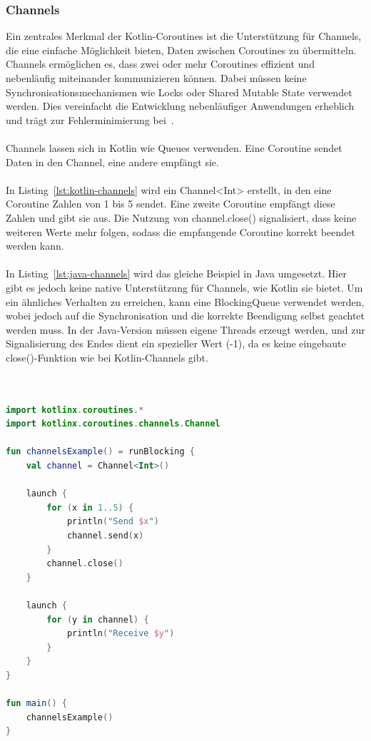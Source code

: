 \documentclass[11pt]{article}
\begin{document}
    \subsubsection{Channels}
    Ein zentrales Merkmal der Kotlin-Coroutines ist die Unterstützung für Channels, die eine einfache Möglichkeit bieten, Daten zwischen Coroutines zu übermitteln.
    Channels ermöglichen es, dass zwei oder mehr Coroutines effizient und nebenläufig miteinander kommunizieren können.
    Dabei müssen keine Synchronisationsmechanismen wie Locks oder Shared Mutable State verwendet werden.
    Dies vereinfacht die Entwicklung nebenläufiger Anwendungen erheblich und trägt zur Fehlerminimierung bei~\cite[208]{kotlin-patterns}.\\
    \\
    Channels lassen sich in Kotlin wie Queues verwenden.
    Eine Coroutine sendet Daten in den Channel, eine andere empfängt sie.\\
    \\
    In Listing~\ref{lst:kotlin-channels} wird ein Channel<Int> erstellt, in den eine Coroutine Zahlen von 1 bis 5 sendet.
    Eine zweite Coroutine empfängt diese Zahlen und gibt sie aus.
    Die Nutzung von channel.close() signalisiert, dass keine weiteren Werte mehr folgen, sodass die empfangende Coroutine korrekt beendet werden kann.\\
    \\
    In Listing~\ref{lst:java-channels} wird das gleiche Beispiel in Java umgesetzt.
    Hier gibt es jedoch keine native Unterstützung für Channels, wie Kotlin sie bietet.
    Um ein ähnliches Verhalten zu erreichen, kann eine BlockingQueue verwendet werden, wobei jedoch auf die Synchronisation und die korrekte Beendigung selbst geachtet werden muss.
    In der Java-Version müssen eigene Threads erzeugt werden, und zur Signalisierung des Endes dient ein spezieller Wert (-1), da es keine eingebaute close()-Funktion wie bei Kotlin-Channels gibt.\\
    \\

    \begin{lstlisting}[language=Kotlin, caption={Channels.kt}, label={lst:kotlin-channels}]

import kotlinx.coroutines.*
import kotlinx.coroutines.channels.Channel

fun channelsExample() = runBlocking {
    val channel = Channel<Int>()

    launch {
        for (x in 1..5) {
            println("Send $x")
            channel.send(x)
        }
        channel.close()
    }

    launch {
        for (y in channel) {
            println("Receive $y")
        }
    }
}

fun main() {
    channelsExample()
}
    \end{lstlisting}
\end{document}
